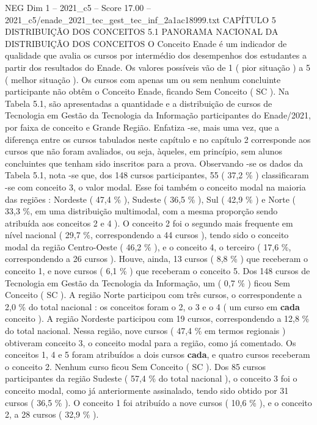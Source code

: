 \begin{textsample}{NEG Dim 1 – 2021\_c5 – Score 17.00 – 2021\_c5/enade\_2021\_tec\_gest\_tec\_inf\_2a1ac18999.txt}  \label{ex:f1_neg_407}
CAPÍTULO 5 DISTRIBUIÇÃO DOS CONCEITOS 5.1 PANORAMA NACIONAL DA DISTRIBUIÇÃO DOS CONCEITOS O Conceito Enade é um indicador de qualidade que avalia os cursos por intermédio dos desempenhos dos estudantes a partir dos resultados do Enade.
Os valores possíveis vão de 1 ( pior situação ) a 5 ( melhor situação ).
Os cursos com apenas um ou sem nenhum concluinte participante não obtêm o Conceito Enade, ficando Sem Conceito ( SC ).
Na Tabela 5.1, são apresentadas a quantidade e a distribuição de cursos de Tecnologia em Gestão da Tecnologia da Informação participantes do Enade/2021, por faixa de conceito e Grande Região.
Enfatiza -se, mais uma vez, que a diferença entre os cursos tabulados neste capítulo e no capítulo 2 corresponde aos cursos que não foram avaliados, ou seja, àqueles, em princípio, sem alunos concluintes que tenham sido inscritos para a prova.
Observando -se os dados da Tabela 5.1, nota -se que, dos 148 cursos participantes, 55 ( 37,2 \% ) classificaram -se com conceito 3, o valor modal.
Esse foi também o conceito modal na maioria das regiões : Nordeste ( 47,4 \% ), Sudeste ( 36,5 \% ), Sul ( 42,9 \% ) e Norte ( 33,3 \%, em uma distribuição multimodal, com a mesma proporção sendo atribuída aos conceitos 2 e 4 ).
O conceito 2 foi o segundo mais frequente em nível nacional ( 29,7 \%, correspondendo a 44 cursos ), tendo sido o conceito modal da região Centro-Oeste ( 46,2 \% ), e o conceito 4, o terceiro ( 17,6 \%, correspondendo a 26 cursos ).
Houve, ainda, 13 cursos ( 8,8 \% ) que receberam o conceito 1, e nove cursos ( 6,1 \% ) que receberam o conceito 5.
Dos 148 cursos de Tecnologia em Gestão da Tecnologia da Informação, um ( 0,7 \% ) ficou Sem Conceito ( SC ).
A região Norte participou com três cursos, o correspondente a 2,0 \% do total nacional : os conceitos foram o 2, o 3 e o 4 ( um curso em \textbf{cada} conceito ).
A região Nordeste participou com 19 cursos, correspondendo a 12,8 \% do total nacional.
Nessa região, nove cursos ( 47,4 \% em termos regionais ) obtiveram conceito 3, o conceito modal para a região, como já comentado.
Os conceitos 1, 4 e 5 foram atribuídos a dois cursos \textbf{cada}, e quatro cursos receberam o conceito 2.
Nenhum curso ficou Sem Conceito ( SC ).
Dos 85 cursos participantes da região Sudeste ( 57,4 \% do total nacional ), o conceito 3 foi o conceito modal, como já anteriormente assinalado, tendo sido obtido por 31 cursos ( 36,5 \% ).
O conceito 1 foi atribuído a nove cursos ( 10,6 \% ), e o conceito 2, a 28 cursos ( 32,9 \% ).

\end{textsample}
